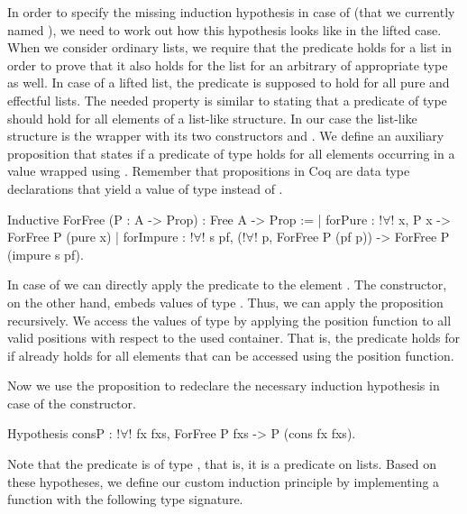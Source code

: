 In order to specify the missing induction hypothesis in case of  (that we currently named ), we need to work out how this hypothesis looks like in the lifted case.
When we consider ordinary lists, we require that the predicate holds for a list  in order to prove that it also holds for the list  for an arbitrary  of appropriate type as well.
In case of a lifted list, the predicate is supposed to hold for all
pure and effectful lists.
The needed property is similar to stating that a predicate of type  should hold for all elements of a list\--like structure.
In our case the list\--like structure is the  wrapper with its two constructors  and .
We define an auxiliary proposition  that states if a predicate of type  holds for all elements occurring in a value wrapped using .
Remember that propositions in Coq are data type declarations that yield a value of type  instead of .

\begin{coqcode}
Inductive ForFree (P : A -> Prop) : Free A -> Prop :=
| forPure   : !$\forall$! x, P x -> ForFree P (pure x)
| forImpure : !$\forall$! s pf, (!$\forall$! p, ForFree P (pf p)) -> ForFree P (impure s pf).
\end{coqcode}

In case of  we can directly apply the predicate to the element .
The  constructor, on the other hand, embeds values of type .
Thus, we can apply the proposition  recursively.
We access the values of type  by applying the position function to all valid positions with respect to the used container.
That is, the predicate holds for  if  already holds for all elements that can be accessed using the position function.

Now we use the proposition  to redeclare the necessary induction hypothesis in case of the  constructor.

\begin{coqcode}
Hypothesis consP : !$\forall$! fx fxs, ForFree P fxs -> P (cons fx fxs).
\end{coqcode}

Note that the predicate  is of type , that is, it is a predicate on lists.
Based on these hypotheses, we define our custom induction principle by implementing a function with the following type signature.

